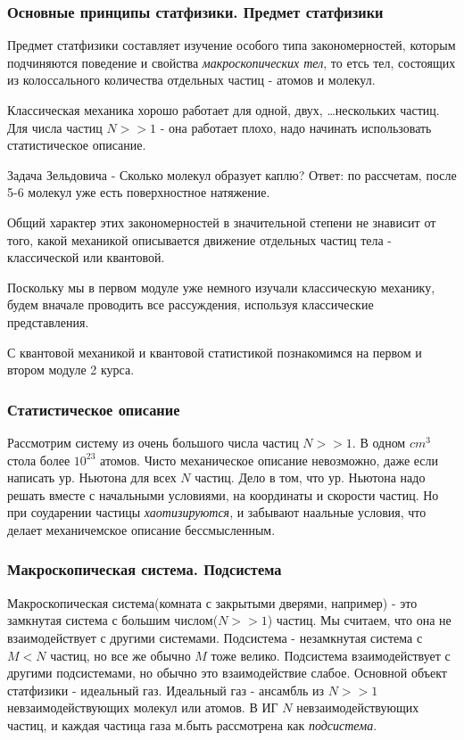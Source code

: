 \documentclass{article}
\begin{document}
\subsubsection{Основные принципы статфизики. Предмет статфизики}
Предмет статфизики составляет изучение особого типа закономерностей, которым подчиняются поведение и свойства \emph{макроскопических тел}, то етсь тел, состоящих из колоссального количества отдельных частиц - атомов и молекул.

Классическая механика хорошо работает для одной, двух, \ldots нескольких частиц. Для числа частиц $N>>1$ - она работает плохо, надо начинать использовать статистическое описание. 

Задача Зельдовича - Сколько молекул образует каплю? Ответ: по рассчетам, после 5-6 молекул уже есть поверхностное натяжение.

Общий характер этих закономерностей в значительной степени не знависит от того, какой механикой описывается движение отдельных частиц тела - классической или квантовой.

Поскольку мы в первом модуле уже немного изучали классическую механику, будем вначале проводить все рассуждения, используя классические представления. 

С квантовой механикой и квантовой статистикой познакомимся на первом и втором модуле 2 курса.

\subsubsection{Статистическое описание}
Рассмотрим систему из очень большого числа частиц $N>>1$. В одном $cm^3$ стола более $10^{23}$ атомов. Чисто механическое описание невозможно, даже если написать ур. Ньютона для всех $N$ частиц. Дело в том, что ур. Ньютона надо решать вместе с начальными условиями, на координаты и скорости частиц. Но при соударении частицы \emph{хаотизируются}, и забывают наальные условия, что делает механичемское описание бессмысленным. 

\subsubsection{Макроскопическая система. Подсистема}
Макроскопическая система(комната с закрытыми дверями, например) - это замкнутая система с большим числом($N>>1$) частиц. Мы считаем, что она не взаимодействует с другими системами. Подсистема - незамкнутая система с $M<N$ частиц, но все же обычно $M$ тоже велико. Подсистема взаимодействует с другими подсистемами, но обычно это взаимодействие слабое. Основной объект статфизики - идеальный газ. Идеальный газ - ансамбль из $N>>1$ 	невзаимодействующих молекул или атомов. В ИГ $N$ невзаимодействующих частиц, и каждая частица газа м.быть рассмотрена как \emph{подсистема}.
\end{document}
